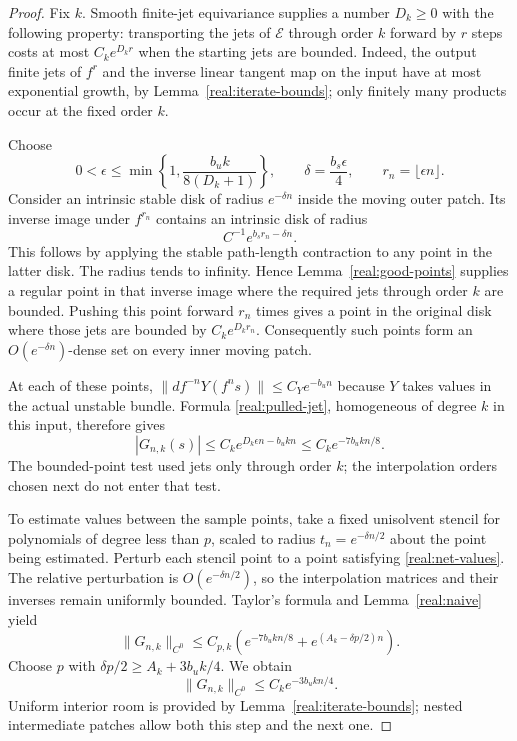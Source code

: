\begin{proof}
Fix $k$. Smooth finite-jet equivariance supplies a number $D_k\ge0$
with the following property: transporting the jets of
$\mathcal E$ through order $k$ forward by $r$ steps costs at most
$C_k e^{D_kr}$ when the starting jets are bounded. Indeed, the
output finite jets of $f^r$ and the inverse linear tangent map on
the input have at most exponential growth, by
Lemma~\ref{real:iterate-bounds}; only finitely many products occur
at the fixed order $k$.

Choose
\[
 0<\epsilon\le\min\left\{1,
       \frac{b_uk}{8(D_k+1)}\right\},
 \qquad \delta=\frac{b_s\epsilon}{4},
 \qquad r_n=\lfloor\epsilon n\rfloor.
\]
Consider an intrinsic stable disk of radius $e^{-\delta n}$ inside
the moving outer patch. Its inverse image under $f^{r_n}$ contains
an intrinsic disk of radius
\[
 C^{-1}e^{b_sr_n-\delta n}.
\]
This follows by applying the stable path-length contraction to any
point in the latter disk. The radius tends to infinity. Hence
Lemma~\ref{real:good-points} supplies a regular point in that inverse
image where the required jets through order $k$ are bounded.
Pushing this point forward $r_n$ times gives a point in the original
disk where those jets are bounded by $C_k e^{D_kr_n}$.
Consequently such points form an $O(e^{-\delta n})$-dense set on
every inner moving patch.

At each of these points, $\|df^{-n}Y(f^ns)\|\le C_Ye^{-b_un}$
because $Y$ takes values in the actual unstable bundle. Formula
\eqref{real:pulled-jet}, homogeneous of degree $k$ in this input,
therefore gives
\begin{equation}\label{real:net-values}
 |G_{n,k}(s)|
 \le C_k e^{D_k\epsilon n-b_ukn}
 \le C_k e^{-7b_ukn/8}.
\end{equation}
The bounded-point test used jets only through order $k$; the
interpolation orders chosen next do not enter that test.

To estimate values between the sample points, take a fixed
unisolvent stencil for polynomials of degree less than $p$, scaled
to radius $t_n=e^{-\delta n/2}$ about the point being estimated.
Perturb each stencil point to a point satisfying
\eqref{real:net-values}. The relative perturbation is
$O(e^{-\delta n/2})$, so the interpolation matrices and their
inverses remain uniformly bounded. Taylor's formula and
Lemma~\ref{real:naive} yield
\[
 \|G_{n,k}\|_{C^0}
 \le C_{p,k}\left(e^{-7b_ukn/8}
                 +e^{(A_k-\delta p/2)n}\right).
\]
Choose $p$ with $\delta p/2\ge A_k+3b_uk/4$. We obtain
\begin{equation}\label{real:improved-values}
 \|G_{n,k}\|_{C^0}\le C_k e^{-3b_ukn/4}.
\end{equation}
Uniform interior room is provided by
Lemma~\ref{real:iterate-bounds}; nested intermediate patches allow
both this step and the next one.


\end{proof}
